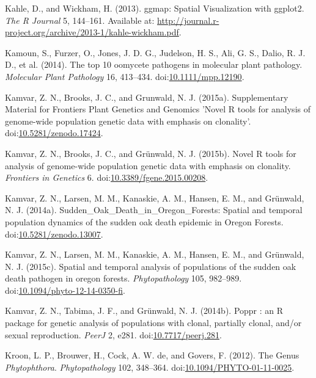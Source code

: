 \documentclass[double,12pt]{beavtex}
\begin{document}
  \hypertarget{ref-khale2013ggmap}{}
  Kahle, D., and Wickham, H. (2013). ggmap: Spatial Visualization with
  ggplot2. \emph{The R Journal} 5, 144--161. Available at:
  \url{http://journal.r-project.org/archive/2013-1/kahle-wickham.pdf}.
  
  \hypertarget{ref-kamoun2014top}{}
  Kamoun, S., Furzer, O., Jones, J. D. G., Judelson, H. S., Ali, G. S.,
  Dalio, R. J. D., et al. (2014). The top 10 oomycete pathogens in
  molecular plant pathology. \emph{Molecular Plant Pathology} 16,
  413--434.
  doi:\href{https://doi.org/10.1111/mpp.12190}{10.1111/mpp.12190}.
  
  \hypertarget{ref-kamvar2015poppr2supp}{}
  Kamvar, Z. N., Brooks, J. C., and Grunwald, N. J. (2015a). Supplementary
  Material for Frontiers Plant Genetics and Genomics 'Novel R tools for
  analysis of genome-wide population genetic data with emphasis on
  clonality'.
  doi:\href{https://doi.org/10.5281/zenodo.17424}{10.5281/zenodo.17424}.
  
  \hypertarget{ref-kamvar2015novel}{}
  Kamvar, Z. N., Brooks, J. C., and Grünwald, N. J. (2015b). Novel R tools
  for analysis of genome-wide population genetic data with emphasis on
  clonality. \emph{Frontiers in Genetics} 6.
  doi:\href{https://doi.org/10.3389/fgene.2015.00208}{10.3389/fgene.2015.00208}.
  
  \hypertarget{ref-kamvar2014sudden}{}
  Kamvar, Z. N., Larsen, M. M., Kanaskie, A. M., Hansen, E. M., and
  Grünwald, N. J. (2014a). Sudden\_Oak\_Death\_in\_Oregon\_Forests:
  Spatial and temporal population dynamics of the sudden oak death
  epidemic in Oregon Forests.
  doi:\href{https://doi.org/10.5281/zenodo.13007}{10.5281/zenodo.13007}.
  
  \hypertarget{ref-kamvar2015spatial}{}
  Kamvar, Z. N., Larsen, M. M., Kanaskie, A. M., Hansen, E. M., and
  Grünwald, N. J. (2015c). Spatial and temporal analysis of populations of
  the sudden oak death pathogen in oregon forests. \emph{Phytopathology}
  105, 982--989.
  doi:\href{https://doi.org/10.1094/phyto-12-14-0350-fi}{10.1094/phyto-12-14-0350-fi}.
  
  \hypertarget{ref-kamvar2014poppr}{}
  Kamvar, Z. N., Tabima, J. F., and Grünwald, N. J. (2014b). Poppr : an R
  package for genetic analysis of populations with clonal, partially
  clonal, and/or sexual reproduction. \emph{PeerJ} 2, e281.
  doi:\href{https://doi.org/10.7717/peerj.281}{10.7717/peerj.281}.
  
  \hypertarget{ref-kroon2012genus}{}
  Kroon, L. P., Brouwer, H., Cock, A. W. de, and Govers, F. (2012). The
  Genus \emph{Phytophthora}. \emph{Phytopathology} 102, 348--364.
  doi:\href{https://doi.org/10.1094/PHYTO-01-11-0025}{10.1094/PHYTO-01-11-0025}.
  
\end{document}
